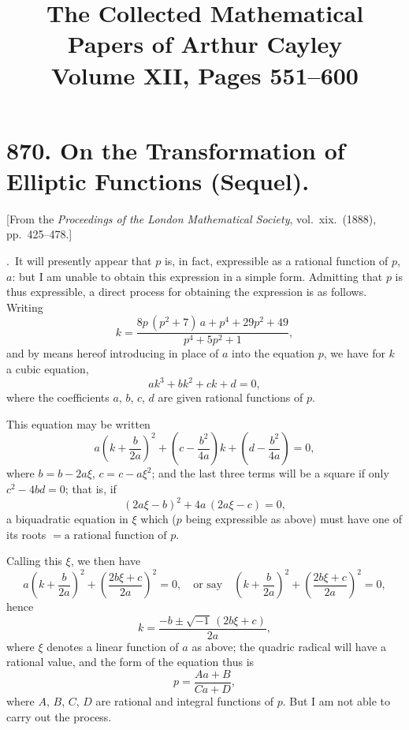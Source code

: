 \documentclass[12pt,a4paper]{article}
\title{\textbf{The Collected Mathematical Papers of Arthur Cayley}\\[6pt]
\large Volume XII, Pages 551--600}
\author{}
\date{}
\theoremstyle{plain}
\begin{document}
\maketitle
\thispagestyle{empty}
\tableofcontents
\newpage

\section[870]{870. On the Transformation of Elliptic Functions (Sequel).}
\label{sec:870}

[From the \textit{Proceedings of the London Mathematical Society}, vol.\ xix.\ (1888), pp.\ 425--478.]

\bigskip{}.\ It will presently appear that $p$ is, in fact, expressible as a rational function of $p$, $a$: but I am unable to obtain this expression in a simple form. Admitting that $p$ is thus expressible, a direct process for obtaining the expression is as follows. Writing
\[
k = \frac{8p\,(p^{2}+7)\,a + p^{4} + 29p^{2} + 49}{p^{4}+5p^{2}+1},
\]
and by means hereof introducing in place of $a$ into the equation $p$, we have for $k$ a cubic equation,
\[
ak^{3} + bk^{2} + ck + d = 0,
\]
where the coefficients $a$, $b$, $c$, $d$ are given rational functions of $p$.

This equation may be written
\[
a\left(k + \frac{b}{2a}\right)^{2} + \left(c - \frac{b^{2}}{4a}\right)k + \left(d - \frac{b^{2}}{4a}\right) = 0,
\]
where $b = b - 2a\xi$, $c = c - a\xi^{2}$; and the last three terms will be a square if only $c^{2} - 4bd = 0$; that is, if
\[
(2a\xi - b)^{2} + 4a\,(2a\xi - c) = 0,
\]
a biquadratic equation in $\xi$ which ($p$ being expressible as above) must have one of its roots $= \text{a rational function of } p$.

Calling this $\xi$, we then have
\[
a\left(k + \frac{b}{2a}\right)^{2} + \left(\frac{2b\xi + c}{2a}\right)^{2} = 0, \quad \text{or say}\quad
\left(k + \frac{b}{2a}\right)^{2} + \left(\frac{2b\xi + c}{2a}\right)^{2} = 0,
\]
hence
\[
k = \frac{-b \pm \sqrt{-1}\,(2b\xi + c)}{2a},
\]
where $\xi$ denotes a linear function of $a$ as above; the quadric radical will have a rational value, and the form of the equation thus is
\[
p = \frac{Aa + B}{Ca + D},
\]
where $A$, $B$, $C$, $D$ are rational and integral functions of $p$. But I am not able to carry out the process.
\end{document}
